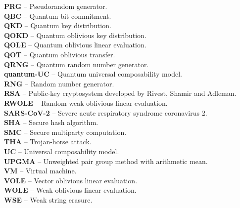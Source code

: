 \textbf{PRG} -- Pseudorandom generator.
\vspace{0.5cm}\\
\textbf{QBC} -- Quantum bit commitment.
\vspace{0.5cm}\\
\textbf{QKD} -- Quantum key distribution.
\vspace{0.5cm}\\
\textbf{QOKD} -- Quantum oblivious key distribution.
\vspace{0.5cm}\\
\textbf{QOLE} -- Quantum oblivious linear evaluation.
\vspace{0.5cm}\\
\textbf{QOT} -- Quantum oblivious transfer.
\vspace{0.5cm}\\
\textbf{QRNG} -- Quantum random number generator.
\vspace{0.5cm}\\
\textbf{quantum-UC} -- Quantum universal composability model.
\vspace{0.5cm}\\
\textbf{RNG} -- Random number generator.
\vspace{0.5cm}\\
\textbf{RSA} -- Public-key cryptosystem developed by Rivest, Shamir and Adleman.
\vspace{0.5cm}\\
\textbf{RWOLE} -- Random weak oblivious linear evaluation.
\vspace{0.5cm}\\
\textbf{SARS-CoV-2} -- Severe acute respiratory syndrome coronavirus 2.
\vspace{0.5cm}\\
\textbf{SHA} -- Secure hash algorithm.
\vspace{0.5cm}\\
\textbf{SMC} -- Secure multiparty computation.
\vspace{0.5cm}\\
\textbf{THA} -- Trojan-horse attack.
\vspace{0.5cm}\\
\textbf{UC} -- Universal composability model.
\vspace{0.5cm}\\
\textbf{UPGMA} -- Unweighted pair group method with arithmetic mean.
\vspace{0.5cm}\\
\textbf{VM} -- Virtual machine.
\vspace{0.5cm}\\
\textbf{VOLE} -- Vector oblivious linear evaluation.
\vspace{0.5cm}\\
\textbf{WOLE} -- Weak oblivious linear evaluation.
\vspace{0.5cm}\\
\textbf{WSE} -- Weak string erasure.
\vspace{0.5cm}\\








